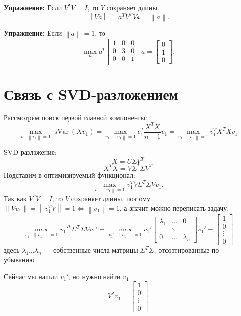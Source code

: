 \documentclass[12pt]{article} %
\theoremstyle{definition} %
\DeclareMathOperator{\sVar}{sVar}
\begin{document}
\textbf{Упражнение:} Если \(V^TV=I\), то \(V\) сохраняет длины.
\[ \left\| Va \right\| = a^TV^TVa = \left\| a \right\|. \]

\textbf{Упражнение:} Если \( \left\| a \right\| = 1 \),
то
\[ \max_a a^T
\begin{bmatrix}
1 & 0 & 0 \\
0 & 3 & 0 \\
0 & 0 & 1 \\
\end{bmatrix}
a =
\begin{bmatrix}
0\\
1\\
0
\end{bmatrix}.
\]

\section{Связь с SVD-разложением}
Рассмотрим поиск первой главной компоненты:
\[ \max_{v_1: \left\| v_1 \right\| = 1} \sVar(Xv_1)
= \max_{v_1: \left\| v_1 \right\| = 1} v_1^T \frac{X^TX}{n-1} v_1 =
\max_{v_1: \left\| v_1 \right\| = 1} v_1^T X^TX v_1 \]

SVD-разложение:
\[ X = U\Sigma V^T \]
\[ X^TX = V \Sigma^T \Sigma V^T \]
Подставим в оптимизируемый функционал:
\[ \max_{v_1: \left\| v_1 \right\| = 1} v_1^T V \Sigma^T \Sigma V v_1.\]
Так как \(V^TV=I\), то \(V\) сохраняет длины, поэтому
\( \left\| Vv_1 \right\| = \left\| v_1^T V \right\| = 1 \iff \left\| v_1 \right\|=1\), а значит можно переписать задачу:
\[ \max_{v_1': \left\| v_1' \right\| = 1} v_1'^T \Sigma^T \Sigma V v_1'
=
\max_{v_1': \left\| v_1' \right\| = 1}
v_1'
\begin{bmatrix}
\lambda_1 & \dots & 0\\
& \ddots &\\
0 & \dots & \lambda_n
\end{bmatrix} v_1' =
\begin{bmatrix}
1\\
0\\
\vdots\\
0
\end{bmatrix}\]
здесь \(\lambda_1 \dots \lambda_n\)  —  собственные числа матрицы \(\Sigma^T\Sigma\),
отсортированные по убыванию.

Сейчас мы нашли \(v_1'\), но нужно найти \(v_1\).
\[V^Tv_1 =
\begin{bmatrix}
1\\
0\\
\vdots\\
0
\end{bmatrix}\]
\end{document}
